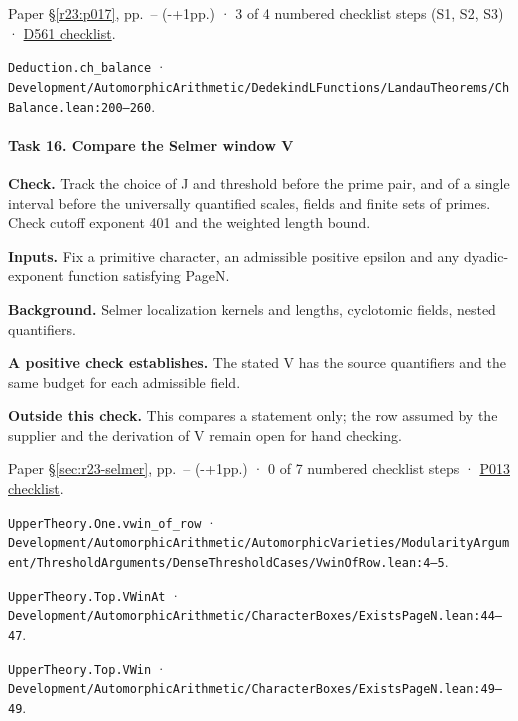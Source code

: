 Paper \S\ref{r23:p017}, pp.\ \pageref{r24:balance}--\pageref{v5:balance-end} (\number\numexpr{}-+1\relax pp.) · 3 of 4 numbered checklist steps (S1, S2, S3) · \href{https://github.com/GunheeC/rh-lean-verification-atlas/blob/v0.1.0/units/D561.check.md}{D561 checklist}.

\nolinkurl{Deduction.ch_balance} · \nolinkurl{Development/AutomorphicArithmetic/DedekindLFunctions/LandauTheorems/ChBalance.lean:200–260}.

\paragraph{Task 16. Compare the Selmer window V}\label{v7:task-16}

\textbf{Check.} Track the choice of J and threshold before the prime pair, and of a single interval before the universally quantified scales, fields and finite sets of primes. Check cutoff exponent 401 and the weighted length bound.

\textbf{Inputs.} Fix a primitive character, an admissible positive epsilon and any dyadic-exponent function satisfying PageN.

\textbf{Background.} Selmer localization kernels and lengths, cyclotomic fields, nested quantifiers.

\textbf{A positive check establishes.} The stated V has the source quantifiers and the same budget for each admissible field.

\textbf{Outside this check.} This compares a statement only; the row assumed by the supplier and the derivation of V remain open for hand checking.

Paper \S\ref{sec:r23-selmer}, pp.\ \pageref{sec:r23-selmer}--\pageref{sec:r23-p012} (\number\numexpr{}-+1\relax pp.) · 0 of 7 numbered checklist steps · \href{https://github.com/GunheeC/rh-lean-verification-atlas/blob/v0.1.0/units/P013.check.md}{P013 checklist}.

\nolinkurl{UpperTheory.One.vwin_of_row} · \nolinkurl{Development/AutomorphicArithmetic/AutomorphicVarieties/ModularityArgument/ThresholdArguments/DenseThresholdCases/VwinOfRow.lean:4–5}.

\nolinkurl{UpperTheory.Top.VWinAt} · \nolinkurl{Development/AutomorphicArithmetic/CharacterBoxes/ExistsPageN.lean:44–47}.

\nolinkurl{UpperTheory.Top.VWin} · \nolinkurl{Development/AutomorphicArithmetic/CharacterBoxes/ExistsPageN.lean:49–49}.

